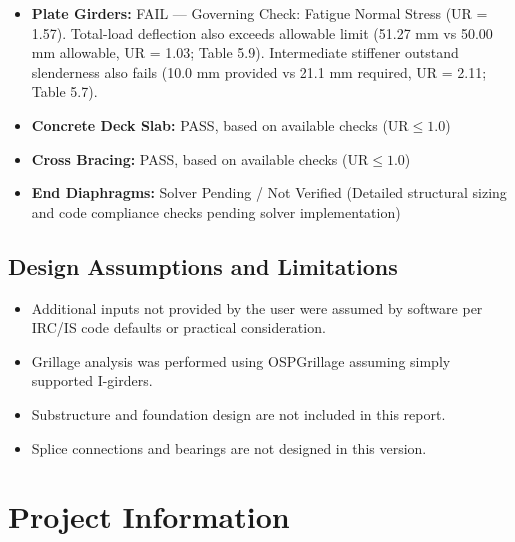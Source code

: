 \documentclass[12pt,a4paper]{report}
\numberwithin{table}{chapter}
\numberwithin{figure}{chapter}
\begin{document}
\begin{itemize}
\item \textbf{Plate Girders:} FAIL --- Governing Check: Fatigue Normal Stress (UR = 1.57). Total-load deflection also exceeds allowable limit (51.27 mm vs 50.00 mm allowable, UR = 1.03; Table 5.9). Intermediate stiffener outstand slenderness also fails (10.0 mm provided vs 21.1 mm required, UR = 2.11; Table 5.7).
\item \textbf{Concrete Deck Slab:} PASS, based on available checks ($\text{UR} \leq 1.0$)
\item \textbf{Cross Bracing:} PASS, based on available checks ($\text{UR} \leq 1.0$)
\item \textbf{End Diaphragms:} Solver Pending / Not Verified (Detailed structural sizing and code compliance checks pending solver implementation)
\end{itemize}

\section*{Design Assumptions and Limitations}
\label{sec:assumptions}

\begin{itemize}
\item Additional inputs not provided by the user were assumed by software per IRC/IS code defaults or practical consideration.
\item Grillage analysis was performed using OSPGrillage assuming simply supported I-girders.
\item Substructure and foundation design are not included in this report.
\item Splice connections and bearings are not designed in this version.
\end{itemize}

\titleformat{\chapter}[block]{\normalfont\Large\bfseries\centering}{\thechapter}{1em}{}
\titlespacing*{\chapter}{0pt}{-30pt}{10pt}


\chapter{Project Information}
\end{document}

